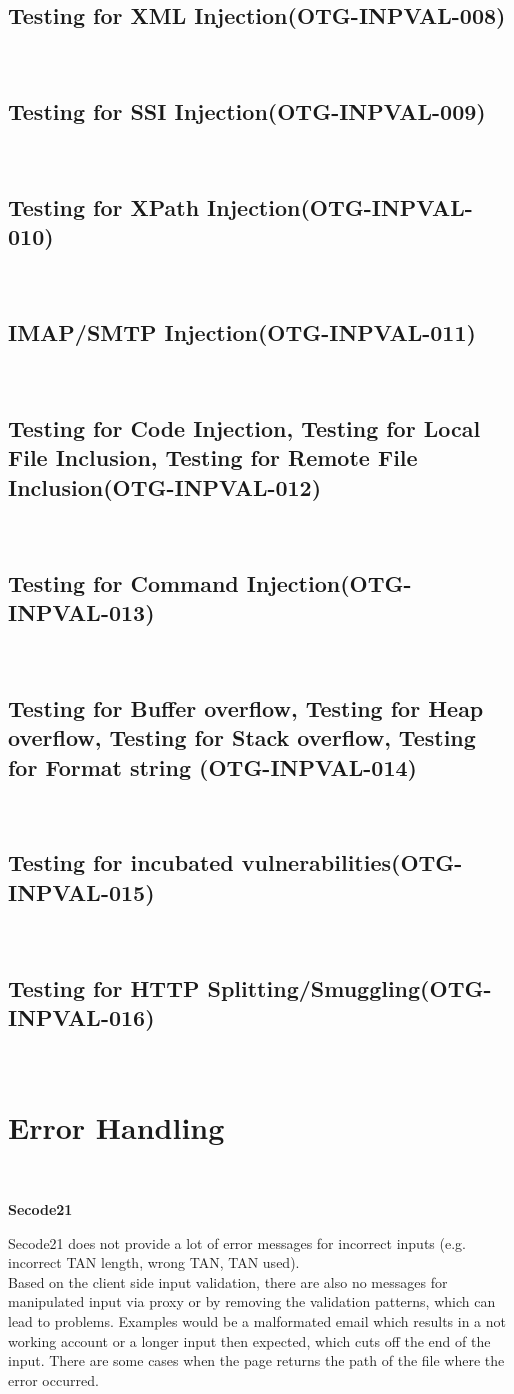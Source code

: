 \documentclass[headsepline,footsepline,footinclude=false,oneside,fontsize=11pt,paper=a4,listof=totoc,bibliography=totoc]{scrbook} %
\begin{document}
\subsection{Testing for XML Injection(OTG-INPVAL-008)}\
\pagebreak 
\subsection{Testing for SSI Injection(OTG-INPVAL-009)}\
\pagebreak 
\subsection{Testing for XPath Injection(OTG-INPVAL-010)}\
\pagebreak 
\subsection{IMAP/SMTP Injection(OTG-INPVAL-011)}\
\pagebreak 
\subsection{Testing for Code Injection, Testing for Local File Inclusion, Testing for Remote File Inclusion(OTG-INPVAL-012)}\
\pagebreak 
\subsection{Testing for Command Injection(OTG-INPVAL-013)}\
\pagebreak 
\subsection{Testing for Buffer overflow, Testing for Heap overflow, Testing for Stack overflow, Testing for Format string (OTG-INPVAL-014)}\
\pagebreak 
\subsection{Testing for incubated vulnerabilities(OTG-INPVAL-015)}\
\pagebreak 
\subsection{Testing for HTTP Splitting/Smuggling(OTG-INPVAL-016)}\

\section{Error Handling}\

\textbf{Secode21}\

Secode21 does not provide a lot of error messages for incorrect inputs (e.g. incorrect TAN
length, wrong TAN, TAN used). \\ 
Based on the client side input validation, there are also no messages for manipulated input via proxy or by removing the validation patterns, which can lead to problems. Examples would be a malformated email which results in a not working account or a longer input then expected, which cuts off the end of the input. There are some cases when the page returns the path of the file where the error occurred.\\   
 
\end{document}
